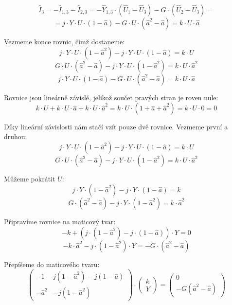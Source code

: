 \documentclass{article}
\begin{document}
$$
    \hat{I}_3 = - \hat{I}_{1,3} - \hat{I}_{2,3} = - \hat{Y}_{1,3} \cdot \left( \hat{U}_1 - \hat{U}_3 \right) - G \cdot \left( \hat{U}_2 - \hat{U}_3 \right) =
$$
$$
    = j \cdot Y \cdot U \cdot \left( 1 - \hat{a} \right) - G \cdot U \cdot \left( \hat{a}^2 - \hat{a} \right) = k \cdot U \cdot \hat{a}
$$

Vezmeme konce rovnic, čímž dostaneme:
$$
    j \cdot Y \cdot U \cdot \left( 1 - \hat{a}^2 \right) - j \cdot Y \cdot U \cdot \left( 1 - \hat{a} \right) = k \cdot U
$$
$$
    G \cdot U \cdot \left( \hat{a}^2 - \hat{a} \right) - j \cdot Y \cdot U \cdot \left( 1 - \hat{a}^2 \right) = k \cdot U \cdot \hat{a}^2
$$
$$
    j \cdot Y \cdot U \cdot \left( 1 - \hat{a} \right) - G \cdot U \cdot \left( \hat{a}^2 - \hat{a} \right) = k \cdot U \cdot \hat{a}
$$

Rovnice jsou lineárně závislé, jelikož součet pravých stran je roven nule:
$$
    k \cdot U + k \cdot U \cdot \hat{a} + k \cdot U \cdot \hat{a}^2 = k \cdot U \cdot \left( 1 + \hat{a} + \hat{a}^2 \right) = k \cdot U \cdot 0 = 0
$$

Díky lineární závislosti nám stačí vzít pouze dvě rovnice. Vezmeme první a druhou:
$$
    j \cdot Y \cdot U \cdot (1 - \hat{a}^2) - j \cdot Y \cdot U \cdot (1 - \hat{a}) = k \cdot U
$$
$$
    G \cdot U \cdot (\hat{a}^2 - \hat{a}) - j \cdot Y \cdot U \cdot (1 - \hat{a}^2) = k \cdot U \cdot \hat{a}^2
$$

Můžeme pokrátit $U$:
$$
    j \cdot Y \cdot (1 - \hat{a}^2) - j \cdot Y \cdot (1 - \hat{a}) = k
$$
$$
    G \cdot (\hat{a}^2 - \hat{a}) - j \cdot Y \cdot (1 - \hat{a}^2) = k \cdot \hat{a}^2
$$

Připravíme rovnice na maticový tvar:
$$
    -k + \left( j \cdot (1 - \hat{a}^2) - j \cdot (1 - \hat{a}) \right) \cdot Y = 0
$$
$$
    -k \cdot \hat{a}^2 - j \cdot (1 - \hat{a}^2) \cdot Y = -G \cdot (\hat{a}^2 - \hat{a})
$$

Přepíšeme do maticového tvaru:
$$
    \begin{pmatrix}
        -1         & j (1 - \hat{a}^2) - j (1 - \hat{a}) \\
        -\hat{a}^2 & - j (1 - \hat{a}^2)
    \end{pmatrix}
    \cdot
    \begin{pmatrix}
        k \\
        Y
    \end{pmatrix}
    =
    \begin{pmatrix}
        0 \\
        -G (\hat{a}^2 - \hat{a})
    \end{pmatrix}
$$
\end{document}
